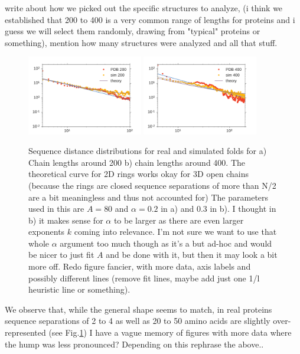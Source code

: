\documentclass[reprint,amsmath,amssymb,rmp,onecolumn,notitlepage,11pt]{revtex4-1}
\newcommand{\red}[1]{\textcolor{red!80!black}{#1}}
\begin{document}
 \red{write about how we picked out the specific structures to analyze, (i think we established that 200 to 400 is a very common range of lengths for proteins and i guess we will select them randomly, drawing from "typical" proteins or something), mention how many structures were analyzed and all that stuff.}
 
\begin{figure}[h]
        \centering
	\includegraphics[width=0.45\textwidth]{figures/both_200.pdf}
	\includegraphics[width=0.45\textwidth]{figures/both_400.pdf}
        \caption{Sequence distance distributions for real and simulated folds for a) Chain lengths around 200 b) chain lengths around 400. The theoretical curve for 2D rings works okay for 3D open chains (because the rings are closed sequence separations of more than N/2 are a bit meaningless and thus not accounted for) The parameters used in this are $A=80$ and $\alpha=0.2$ in a) and $0.3$ in b). I thought in b) it makes sense for $\alpha$ to be larger as there are even larger exponents $k$ coming into relevance. I'm not sure we want to use that whole $\alpha$ argument too much though as it's a but ad-hoc and would be nicer to just fit $A$ and be done with it, but then it may look a bit more off. \red{Redo figure fancier, with more data, axis labels and possibly different lines (remove fit lines, maybe add just one 1/l heuristic line or something).}
        }
        \label{fig:sdd}
\end{figure}
We observe that, while the general shape seems to match, in real proteins sequence separations of 2 to 4 as well as 20 to 50 amino acids are slightly over-represented (see Fig.\ref{fig:sdd}) \red{I have a vague memory of figures with more data where the hump was less pronounced? Depending on this rephrase the above.}.
\end{document}

